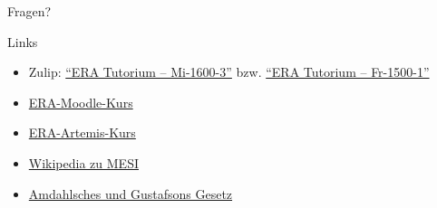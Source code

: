 \begin{frame}[c, fragile]{}{}
	\begin{center}
		\LARGE Fragen?
	\end{center}
\end{frame}

\begin{frame}[c, fragile]{Links}{}
	\begin{itemize}
		\item Zulip: \href{https://zulip.in.tum.de/#narrow/channel/3255-ERA-Tutorium-.E2.80.93-Mi-1600-3}{\enquote{ERA Tutorium -- Mi-1600-3}}
		      bzw. \href{https://zulip.in.tum.de/#narrow/channel/3264-ERA-Tutorium-.E2.80.93-Fr-1500-1}{\enquote{ERA Tutorium -- Fr-1500-1}}
		\item \href{https://www.moodle.tum.de/course/view.php?id=111440}{ERA-Moodle-Kurs}
		\item \href{https://artemis.tum.de/courses/516}{ERA-Artemis-Kurs}
		\item \href{https://de.wikipedia.org/wiki/MESI}{Wikipedia zu MESI}
		\item \href{https://www.educative.io/answers/difference-between-amdahls-and-gustafsons-laws}{Amdahlsches und Gustafsons Gesetz}
	\end{itemize}
\end{frame}

\maketitle


